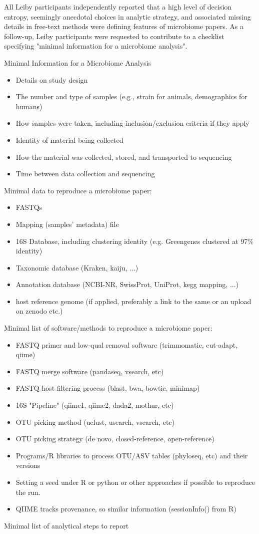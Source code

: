 \documentclass{drexelthesis}
\begin{document}
All Leiby participants independently reported that a high level of decision entropy, seemingly anecdotal choices in analytic strategy, and associated missing details in free-text methods were defining features of microbiome papers. As a follow-up, Leiby participants were requested to contribute to a checklist specifying "minimal information for a microbiome analysis".


\small{
\onehalfspacing
Minimal Information for a Microbiome Analysis
\begin{itemize}
\item Details on study design
\item The number and type of samples (e.g., strain for animals, demographics for humans)
\item How samples were taken, including inclusion/exclusion criteria if they apply
\item Identity of material being collected
\item How the material was collected, stored, and transported to sequencing
\item Time between data collection and sequencing
\end{itemize}

Minimal data to reproduce a microbiome paper:

\begin{itemize}
\item FASTQs
\item Mapping (samples' metadata) file
\item 16S Database, including clustering identity (e.g. Greengenes clustered at 97$\%$ identity)
\item Taxonomic database (Kraken, kaiju, ...)
\item Annotation database (NCBI-NR, SwissProt, UniProt, kegg mapping, ...)
\item host reference genome (if applied, preferably a link to the same or an upload on zenodo etc.)
\end{itemize}
Minimal list of software/methods to reproduce a microbiome paper:

\begin{itemize}
\item FASTQ primer and low-qual removal software (trimmomatic, cut-adapt, qiime) 
\item FASTQ merge software (pandaseq, vsearch, etc)
\item FASTQ host-filtering process (blast, bwa, bowtie, minimap)
\item 16S "Pipeline" (qiime1, qiime2, dada2, mothur, etc)
\item OTU picking method (uclust, usearch, vsearch, etc)
\item OTU picking strategy (de novo, closed-reference, open-reference)
\item Programs/R libraries to process OTU/ASV tables (phyloseq, etc) and their versions
\item Setting a seed under R or python or other approaches if possible to reproduce the run. 
\item QIIME tracks provenance, so similar information (sessionInfo() from R)
\end{itemize}
Minimal list of analytical steps to report

}
\end{document}
